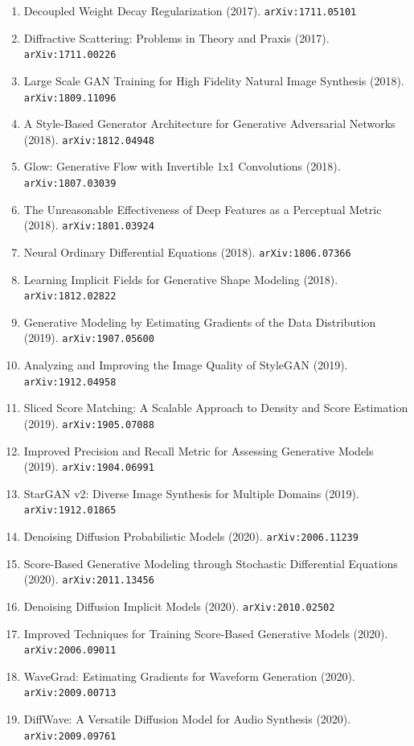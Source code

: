 \documentclass[11pt]{article}
\begin{document}
\begin{enumerate}
  Variation (2017). \texttt{arXiv:1710.10196}
  \item Decoupled Weight Decay Regularization (2017). \texttt{arXiv:1711.05101}
  \item Diffractive Scattering: Problems in Theory and Praxis (2017). \texttt{arXiv:1711.00226}
  \item Large Scale GAN Training for High Fidelity Natural Image Synthesis (2018). \texttt{arXiv:1809.11096}
  \item A Style-Based Generator Architecture for Generative Adversarial Networks (2018). \texttt{arXiv:1812.04948}
  \item Glow: Generative Flow with Invertible 1x1 Convolutions (2018). \texttt{arXiv:1807.03039}
  \item The Unreasonable Effectiveness of Deep Features as a Perceptual Metric (2018). \texttt{arXiv:1801.03924}
  \item Neural Ordinary Differential Equations (2018). \texttt{arXiv:1806.07366}
  \item Learning Implicit Fields for Generative Shape Modeling (2018). \texttt{arXiv:1812.02822}
  \item Generative Modeling by Estimating Gradients of the Data Distribution (2019). \texttt{arXiv:1907.05600}
  \item Analyzing and Improving the Image Quality of StyleGAN (2019). \texttt{arXiv:1912.04958}
  \item Sliced Score Matching: A Scalable Approach to Density and Score
  Estimation (2019). \texttt{arXiv:1905.07088}
  \item Improved Precision and Recall Metric for Assessing Generative Models (2019). \texttt{arXiv:1904.06991}
  \item StarGAN v2: Diverse Image Synthesis for Multiple Domains (2019). \texttt{arXiv:1912.01865}
  \item Denoising Diffusion Probabilistic Models (2020). \texttt{arXiv:2006.11239}
  \item Score-Based Generative Modeling through Stochastic Differential
  Equations (2020). \texttt{arXiv:2011.13456}
  \item Denoising Diffusion Implicit Models (2020). \texttt{arXiv:2010.02502}
  \item Improved Techniques for Training Score-Based Generative Models (2020). \texttt{arXiv:2006.09011}
  \item WaveGrad: Estimating Gradients for Waveform Generation (2020). \texttt{arXiv:2009.00713}
  \item DiffWave: A Versatile Diffusion Model for Audio Synthesis (2020). \texttt{arXiv:2009.09761}

\end{enumerate}
\end{document}
